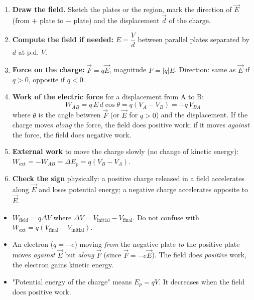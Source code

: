 \documentclass[11pt]{article}
\begin{document}
\begin{methode}
\begin{enumerate}
\item \textbf{Draw the field.} Sketch the plates or the region, mark the direction of $\vec{E}$ (from $+$ plate to $-$ plate) and the displacement $\vec{d}$ of the charge.
\item \textbf{Compute the field if needed:} $E = \dfrac{V}{d}$ between parallel plates separated by $d$ at p.d. $V$.
\item \textbf{Force on the charge:} $\vec{F}=q\vec{E}$, magnitude $F=|q|E$. Direction: same as $\vec{E}$ if $q>0$, opposite if $q<0$.
\item \textbf{Work of the electric force} for a displacement from A to B:
\[ W_{AB} = q\,E\,d\cos\theta = q(V_A - V_B) = -q\,V_{BA} \]
where $\theta$ is the angle between $\vec{F}$ (or $\vec{E}$ for $q>0$) and the displacement. If the charge moves \emph{along} the force, the field does positive work; if it moves \emph{against} the force, the field does negative work.
\item \textbf{External work} to move the charge slowly (no change of kinetic energy): $W_{\text{ext}} = -W_{AB} = \Delta E_p = q(V_B - V_A)$.
\item \textbf{Check the sign} physically: a positive charge released in a field accelerates along $\vec{E}$ and loses potential energy; a negative charge accelerates opposite to $\vec{E}$.
\end{enumerate}
\end{methode}

\begin{attention}
\begin{itemize}
\item $W_{\text{field}} = q\Delta V$ where $\Delta V = V_{\text{initial}} - V_{\text{final}}$. Do not confuse with $W_{\text{ext}} = q(V_{\text{final}} - V_{\text{initial}})$.
\item An electron ($q=-e$) moving \emph{from} the negative plate \emph{to} the positive plate moves \emph{against} $\vec{E}$ but \emph{along} $\vec{F}$ (since $\vec{F}=-e\vec{E}$). The field does \emph{positive} work, the electron gains kinetic energy.
\item "Potential energy of the charge" means $E_p = qV$. It decreases when the field does positive work.
\end{itemize}
\end{attention}
\end{document}
